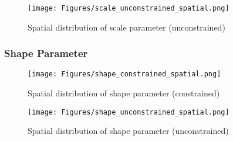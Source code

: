 \begin{figure}[!htbp]
    \centering
    \texttt{[image: Figures/scale\_unconstrained\_spatial.png]}
    \caption{Spatial distribution of scale parameter (unconstrained)}
    \label{fig:scale_unconstrained}
\end{figure}

\clearpage
\subsubsection{Shape Parameter}

\begin{figure}[!htbp]
    \centering
    \texttt{[image: Figures/shape\_constrained\_spatial.png]}
    \caption{Spatial distribution of shape parameter (constrained)}
    \label{fig:shape_constrained}
\end{figure}

\begin{figure}[!htbp]
    \centering
    \texttt{[image: Figures/shape\_unconstrained\_spatial.png]}
    \caption{Spatial distribution of shape parameter (unconstrained)}
    \label{fig:shape_unconstrained}
\end{figure} 